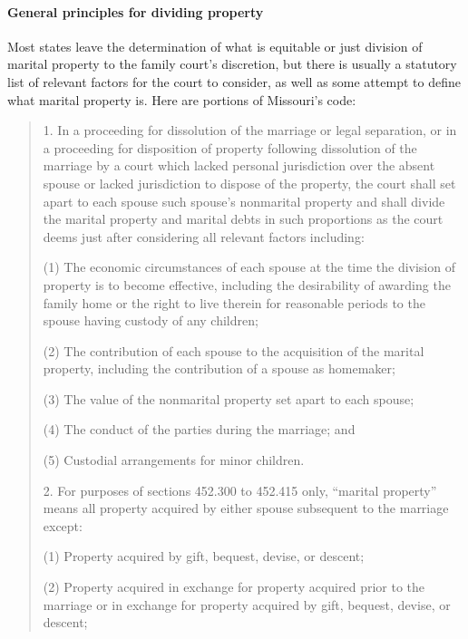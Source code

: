 \paragraph{General principles for dividing property} Most states leave the
determination of what is equitable or just division of marital property to the
family court's discretion, but there is usually a statutory list of relevant
factors for the court to consider, as well as some attempt to define what
marital property is. Here are portions of Missouri's code:
\begin{quotation}
1. In a proceeding for dissolution of the marriage or
legal separation, or in a proceeding for disposition of property following
dissolution of the marriage by a court which lacked personal jurisdiction over
the absent spouse or lacked jurisdiction to dispose of the property, the court
shall set apart to each spouse such spouse's nonmarital property and shall
divide the marital property and marital debts in such proportions as the court
deems just after considering all relevant factors including:
\begin{statute}
\item (1) The economic circumstances of each spouse at the time the division of
property is to become effective, including the desirability of awarding the
family home or the right to live therein for reasonable periods to the spouse
having custody of any children;

\item (2) The contribution of each spouse to the acquisition of the marital property,
including the contribution of a spouse as homemaker;

\item (3) The value of the nonmarital property set apart to each spouse;

\item (4) The conduct of the parties during the marriage; and

\item (5) Custodial arrangements for minor children.
\end{statute}

2. For purposes of sections 452.300 to 452.415 only, ``marital
property'' means all property acquired by either spouse subsequent
to the marriage except:
\begin{statute}
\item (1) Property acquired by gift, bequest, devise, or descent;

\item (2) Property acquired in exchange for property acquired prior to the marriage or
in exchange for property acquired by gift, bequest, devise, or descent;


\end{statute}
\end{quotation}
